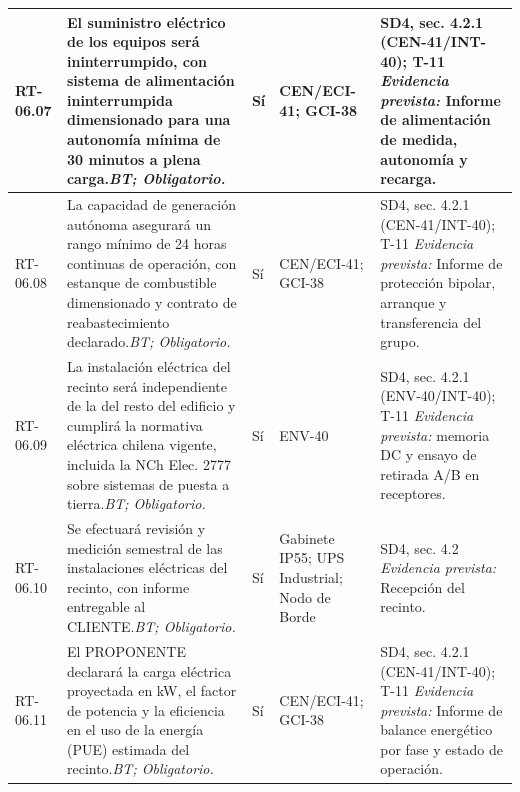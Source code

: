 \begin{paginaHorizontalSynaptix}
\begin{longtable}{|L{0.09\AnchoMatrizTDoce}|L{0.385\AnchoMatrizTDoce}|L{0.065\AnchoMatrizTDoce}|L{0.18\AnchoMatrizTDoce}|L{0.28\AnchoMatrizTDoce}|}
RT-\allowbreak{}06.\allowbreak{}07 &
El suministro eléctrico de los equipos será ininterrumpido, con sistema de alimentación ininterrumpida dimensionado para una autonomía mínima de 30 minutos a plena carga.\newline\textit{BT; Obligatorio.} &
Sí &
CEN/\allowbreak{}ECI-41; GCI-38 &
SD4, sec. 4.2.1 (CEN-41/INT-40); T-11 \newline\textit{Evidencia prevista:} Informe de alimentación de medida, autonomía y recarga. \\ \hline

RT-\allowbreak{}06.\allowbreak{}08 &
La capacidad de generación autónoma asegurará un rango mínimo de 24 horas continuas de operación, con estanque de combustible dimensionado y contrato de reabastecimiento declarado.\newline\textit{BT; Obligatorio.} &
Sí &
CEN/\allowbreak{}ECI-41; GCI-38 &
SD4, sec. 4.2.1 (CEN-41/INT-40); T-11 \newline\textit{Evidencia prevista:} Informe de protección bipolar, arranque y transferencia del grupo. \\ \hline

RT-\allowbreak{}06.\allowbreak{}09 &
La instalación eléctrica del recinto será independiente de la del resto del edificio y cumplirá la normativa eléctrica chilena vigente, incluida la NCh Elec. 2777 sobre sistemas de puesta a tierra.\newline\textit{BT; Obligatorio.} &
Sí &
ENV-40 &
SD4, sec. 4.2.1 (ENV-40/INT-40); T-11 \newline\textit{Evidencia prevista:} memoria DC y ensayo de retirada A/B en receptores. \\ \hline

RT-\allowbreak{}06.\allowbreak{}10 &
Se efectuará revisión y medición semestral de las instalaciones eléctricas del recinto, con informe entregable al CLIENTE.\newline\textit{BT; Obligatorio.} &
Sí &
Gabinete IP55; UPS Industrial; Nodo de Borde &
SD4, sec. 4.2 \newline\textit{Evidencia prevista:} Recepción del recinto. \\ \hline

RT-\allowbreak{}06.\allowbreak{}11 &
El PROPONENTE declarará la carga eléctrica proyectada en kW, el factor de potencia y la eficiencia en el uso de la energía (PUE) estimada del recinto.\newline\textit{BT; Obligatorio.} &
Sí &
CEN/\allowbreak{}ECI-41; GCI-38 &
SD4, sec. 4.2.1 (CEN-41/INT-40); T-11 \newline\textit{Evidencia prevista:} Informe de balance energético por fase y estado de operación. \\ \hline


\end{longtable}
\end{paginaHorizontalSynaptix}
